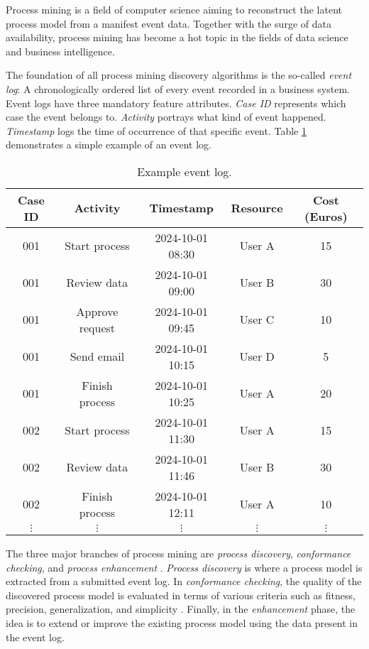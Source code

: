 
Process mining \cite{bible} is a field of computer science aiming to reconstruct the latent process model from a manifest event data. Together with the surge of data availability, process mining has become a hot topic in the fields of data science and business intelligence. 

The foundation of all process mining discovery algorithms is the so-called \emph{event log}: A chronologically ordered list of every event recorded in a business system. Event logs have three mandatory feature attributes. \emph{Case ID} represents which case the event belongs to. \emph{Activity} portrays what kind of event happened. \emph{Timestamp} logs the time of occurrence of that specific event. Table \ref{tab:example_event_log} demonstrates a simple example of an event log.

\renewcommand{\arraystretch}{1.25}
\begin{table}[h!]
    \centering
	\caption{Example event log.}
    \begin{tabular}{|c|c|c|c|c|}
        \hline
        \textbf{Case ID} & \textbf{Activity} & \textbf{Timestamp} & \textbf{Resource} & \textbf{Cost (Euros)} \\ 
        \hline
        001 & Start process  & 2024-10-01 08:30 & User A & 15 \\ 
        001 & Review data    & 2024-10-01 09:00 & User B & 30 \\ 
        001 & Approve request & 2024-10-01 09:45 & User C & 10 \\ 
        001 & Send email     & 2024-10-01 10:15 & User D & 5  \\ 
        001 & Finish process & 2024-10-01 10:25 & User A & 20 \\
		002 & Start process  & 2024-10-01 11:30 & User A & 15 \\ 
        002 & Review data    & 2024-10-01 11:46 & User B & 30 \\ 
        002 & Finish process & 2024-10-01 12:11 & User A & 10 \\ 
		$\vdots$ & $\vdots$ & $\vdots$ & $\vdots$ & $\vdots$ \\
        \hline
    \end{tabular}
    \label{tab:example_event_log}
\end{table}

The three major branches of process mining are \emph{process discovery}, \emph{conformance checking}, and \emph{process enhancement} \cite{bible}. \emph{Process discovery} is where a process model is extracted from a submitted event log. In \emph{conformance checking}, the quality of the discovered process model is evaluated in terms of various criteria such as fitness, precision, generalization, and simplicity \cite{conformance-checking}. Finally, in the \emph{enhancement} phase, the idea is to extend or improve the existing process model using the data present in the event log.


